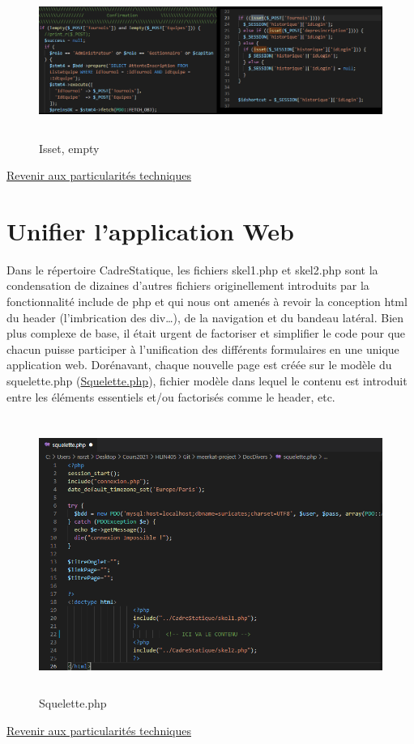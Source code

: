 \documentclass[12pt]{report}
\begin{document}
 \begin{figure}[h]
 \hypertarget{fig-issetempty}{}
			\centering
				\includegraphics[height=5cm]{figures/pt-issetempty.png}
			\caption{Isset, empty}
\end{figure}
\bigskip
\par
\hyperlink{retour-access-auto}{Revenir aux particularités techniques}
 \section {Unifier l’application Web}
 \hypertarget{annexe-unifier-web}{}
\par
Dans le répertoire CadreStatique, les fichiers skel1.php et skel2.php sont la condensation de dizaines d’autres fichiers originellement introduits par la fonctionnalité include de php et qui nous ont amenés à revoir la conception html du header (l’imbrication des div…), de la navigation et du bandeau latéral. Bien plus complexe de base, il était urgent de factoriser et simplifier le code pour que chacun puisse participer à l’unification des différents formulaires en une unique application web. Dorénavant, chaque nouvelle page est créée sur le modèle du squelette.php (\hyperlink{fig-squelette}{Squelette.php}),
fichier modèle dans lequel le contenu est introduit entre les éléments essentiels et/ou factorisés
comme le header, etc.
 \begin{figure}[h]
 				\hypertarget{fig-squelette}{}
			\centering
				\includegraphics[height=9cm]{figures/pt-squelette.png}
			\caption{Squelette.php}
\end{figure}
\bigskip
\par
\hyperlink{retour-unifier}{Revenir aux particularités techniques}
\newpage
\end{document}
